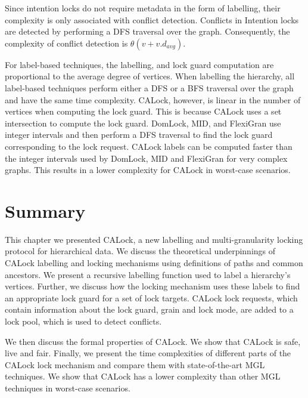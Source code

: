 Since intention locks do not require metadata in the form of labelling, their complexity is only associated with conflict detection. Conflicts in Intention locks are detected by performing a DFS traversal over the graph. Consequently, the complexity of conflict detection is $\theta(v+ {v}.{d_{avg}})$.

For label-based techniques, the labelling, and lock guard computation are proportional to the average degree of vertices. When labelling the hierarchy, all label-based techniques perform either a DFS or a BFS traversal over the graph and have the same time complexity.
CALock, however, is linear in the number of vertices when computing the lock guard. This is because CALock uses a set intersection to compute the lock guard. DomLock, MID, and FlexiGran use integer intervals and then perform a DFS traversal to find the lock guard corresponding to the lock request. CALock labels can be computed faster than the integer intervals used by DomLock, MID and FlexiGran for very complex graphs. This results in a lower complexity for CALock in worst-case scenarios.


\section{Summary}

This chapter we presented CALock, a new labelling and multi-granularity locking protocol for hierarchical data. We discuss the theoretical underpinnings of CALock labelling and locking mechanisms using definitions of paths and common ancestors. We present a recursive labelling function used to label a hierarchy's vertices. Further, we discuss how the locking mechanism uses these labels to find an appropriate lock guard for a set of lock targets. CALock lock requests, which contain information about the lock guard, grain and lock mode, are added to a lock pool, which is used to detect conflicts. 

We then discuss the formal properties of CALock. We show that CALock is safe, live and fair. Finally, we present the time complexities of different parts of the CALock lock mechanism and compare them with state-of-the-art MGL techniques. We show that CALock has a lower complexity than other MGL techniques in worst-case scenarios.